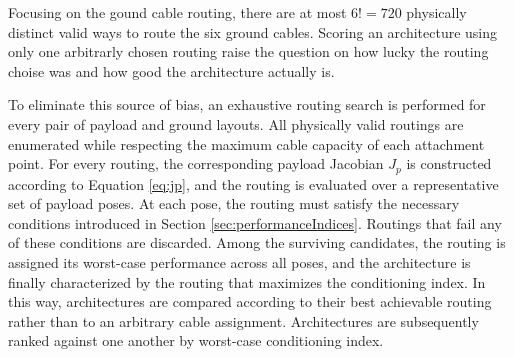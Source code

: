 Focusing on the gound cable routing, there are at most $6! = 720$ physically distinct valid ways to route the six ground cables. Scoring an architecture using only one arbitrarly chosen routing raise the question on how lucky the routing choise was and how good the architecture actually is.

To eliminate this source of bias, an exhaustive routing search is performed for every pair of payload and ground layouts. All physically valid routings are enumerated while respecting the maximum cable capacity of each attachment point. For every routing, the corresponding payload Jacobian $J_p$ is constructed according to Equation \ref{eq:jp}, and the routing is evaluated over a representative set of payload poses. At each pose, the routing must satisfy the necessary conditions introduced in Section \ref{sec:performanceIndices}. Routings that fail any of these conditions are discarded. Among the surviving candidates, the routing is assigned its worst-case performance across all poses, and the architecture is finally characterized by the routing that maximizes the conditioning index. In this way, architectures are compared according to their best achievable routing rather than to an arbitrary cable assignment. Architectures are subsequently ranked against one another by worst-case conditioning index.




